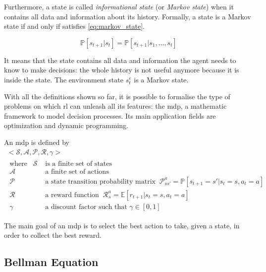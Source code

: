 Furthermore, a state is called \textit{informational state} (or \textit{Markov state}) when it contains all data and information about its history. Formally, a state is a Markov state if and only if satisfies \vref{eq:markov_state}.

\begin{equation} \label{eq:markov_state}
	\mathbb{P}[s_{t+1}| s_t] = \mathbb{P}[s_{t+1} | s_1, \dots, s_t]
\end{equation}

 It means that the state contains all data and information the agent needs to know to make decisions: the whole history is not useful anymore because it is inside the state. The environment state $s_t^e$ is a Markov state.
 
 With all the definitions shown so far, it is possible to formalise the type of problems on which \acrshort{rl} can unleash all its features: the \acrfull{mdp}, a mathematic framework to model decision processes. Its main application fields are optimization and dynamic programming.
 
 An \acrshort{mdp} is defined by 
 \begin{equation}\label{eq:mdp}
 \begin{gathered} 
 <\mathcal{S}, \mathcal{A}, \mathcal{P}, \mathcal{R}, \gamma>\\
 \begin{aligned}
 	\text{where}\hspace{10pt} \mathcal{S} & \text{ is a finite set of states} \\
 	\mathcal{A} & \text{ a finite set of actions} \\
 	\mathcal{P} & \text{ a state transition probability matrix}\;\;
 	 \mathcal{P}_{ss'}^a = \mathbb{P}[s_{t+1}= s' | s_t = s, a_t = a]\\
 	\mathcal{R} & \text{ a reward function}
 	 	\;\; \mathcal{R}_{s}^a = \mathbb{E}[r_{t+1} | s_t = s, a_t = a] \\
 	 \gamma & \text{ a discount factor such that } \gamma \in [0,1]
 \end{aligned}
 \end{gathered}
 \end{equation}


The main goal of an \acrshort{mdp} is to select the best action to take, given a state, in order to collect the best reward. 

\subsection{Bellman Equation}

